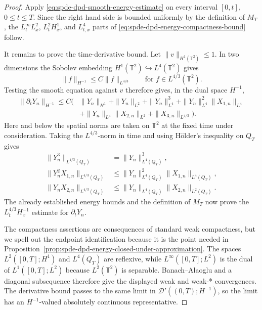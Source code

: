 \begin{proof}
Apply
\eqref{eq:spde-dpd-smooth-energy-estimate} on every interval \([0,t]\),
\(0\leq t\leq T\).  Since the right hand side is bounded uniformly by the
definition of \(M_T\), the \(L^\infty_tL^2_x\), \(L^2_tH^1_x\), and
\(L^4_{t,x}\) parts of
\eqref{eq:spde-dpd-energy-compactness-bound} follow.

It remains to prove the time-derivative bound.  Let
\(\|v\|_{H^1(\mathbb T^2)}\leq1\).  In two dimensions the Sobolev embedding
\(H^1(\mathbb T^2)\hookrightarrow L^4(\mathbb T^2)\) gives
\[
  \|f\|_{H^{-1}}
  \leq C\|f\|_{L^{4/3}}
  \qquad
  \text{for }f\in L^{4/3}(\mathbb T^2).
\]
Testing the smooth equation against \(v\) therefore gives, in the dual
space \(H^{-1}\),
\begin{equation}
\begin{aligned}
  \|\partial_tY_n\|_{H^{-1}}
  \leq C\Big(
    &\|Y_n\|_{H^1}
     +\|Y_n\|_{L^2}
     +\|Y_n\|_{L^4}^3
     +\|Y_n\|_{L^4}^2\|X_{1,n}\|_{L^4}
\\
    &+\|Y_n\|_{L^4}\|X_{2,n}\|_{L^2}
     +\|X_{3,n}\|_{L^{4/3}}
  \Big).
  \label{eq:spde-dpd-time-derivative-pointwise-bound}
\end{aligned}
\end{equation}
Here and below the spatial norms are taken on \(\mathbb T^2\) at the fixed
time under consideration.  Taking the \(L^{4/3}\)-norm in time and using
Hölder's inequality on \(Q_T\) gives
\[
\begin{aligned}
  \|Y_n^3\|_{L^{4/3}(Q_T)}
     &=\|Y_n\|_{L^4(Q_T)}^3,\\
  \|Y_n^2X_{1,n}\|_{L^{4/3}(Q_T)}
     &\leq
       \|Y_n\|_{L^4(Q_T)}^2
       \|X_{1,n}\|_{L^4(Q_T)},\\
  \|Y_nX_{2,n}\|_{L^{4/3}(Q_T)}
     &\leq
       \|Y_n\|_{L^4(Q_T)}
       \|X_{2,n}\|_{L^2(Q_T)} .
\end{aligned}
\]
The already established energy bounds and the definition of \(M_T\) now
prove the \(L^{4/3}_tH^{-1}_x\) estimate for \(\partial_tY_n\).

The compactness assertions are consequences of standard weak compactness,
but we spell out the endpoint identification because it is the point needed
in Proposition~\ref{prop:spde-dpd-energy-closed-under-approximation}.
The spaces \(L^2([0,T];H^1)\) and \(L^4(Q_T)\) are reflexive, while
\(L^\infty([0,T];L^2)\) is the dual of \(L^1([0,T];L^2)\) because
\(L^2(\mathbb T^2)\) is separable.  Banach--Alaoglu and a diagonal
subsequence therefore give the displayed weak and weak-* convergences.
The derivative bound passes to the same limit in
\(\mathcal D'((0,T);H^{-1})\), so the limit has an
\(H^{-1}\)-valued absolutely continuous representative.


\end{proof}
